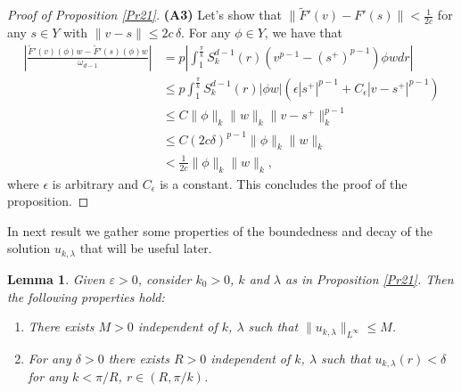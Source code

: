 \documentclass[reqno]{amsart}
\newtheorem{lemma}[theorem]{Lemma}
\def\e{\varepsilon}
\numberwithin{equation}{section}
\newenvironment{key words}{\textbf{Keywords}\mbox{  }}{ }
\begin{document}
\begin{proof}[Proof of Proposition \ref{Pr21}]
\medskip

\textbf{(A3)} Let's show that $\|\tilde{F}'(v)-F'(s)\|<\frac{1}{2c}$ for any $ s \in Y$ with $\|v-s\|\leq 2 c \,\delta.$ For any $\phi\in Y$, we have that
 \begin{align*}
 \left|\frac{\tilde{F}'(v)(\phi)w-\tilde{F}'(s)(\phi)w}{\omega_{d-1}}\right|&=p\left|\int_{1}^{\frac{\pi}{k}}S^{d-1}_{k}(r)
 (v^{p-1}-(s^{+})^{p-1})\phi wdr\right|\\
 &\leq p\int_{1}^{\frac{\pi}{k}}S^{d-1}_{k}(r)|\phi w|(\epsilon |s^{+}|^{p-1}+C_{\epsilon}|v-s^{+}|^{p-1})\\
&\leq C\|\phi\|_k\|w\|_k\|v-s^{+}\|_k^{p-1}\\
&\leq C(2c\delta)^{p-1}\|\phi\|_k\|w\|_k\\
&<\frac{1}{2c}\|\phi\|_k\|w\|_k,
\end{align*}
where $\epsilon$ is arbitrary and $C_{\epsilon}$ is a constant. This concludes the proof of the proposition.
\end{proof}

In next result we gather some properties of the boundedness and decay of the solution $u_{k, \lambda}$ that will be useful later.

\begin{lemma} \label{ultimo} Given $\e>0$, consider $k_0>0$, $k$ and $\lambda$ as in Proposition \ref{Pr21}. Then the following properties hold:
	\begin{enumerate}
		\item There exists $M>0$ independent of $k$, $\lambda$ such that $\| u_{k, \lambda} \|_{L^{\infty}} \leq M$.
		\item For any $\delta >0 $ there exists $R >0$ independent of $k$, $\lambda$ such that $u_{k, \lambda}(r) < \delta$ for any $k < \pi/R$, $r \in (R, \pi/k)$.
\end{enumerate}	\end{lemma}
\end{document}
